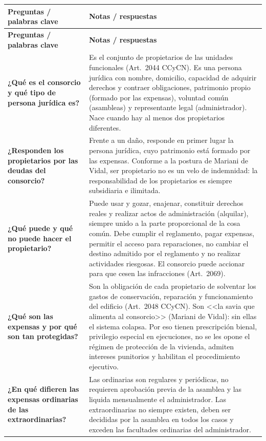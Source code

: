 \documentclass[12pt,oneside]{book}
\newcommand{\cornellheader}{%
    \toprule
    \textbf{Preguntas / palabras clave} &
    \textbf{Notas / respuestas} \\
    \midrule
}
\begin{document}
\begin{longtable}{@{}>{\raggedright\arraybackslash}p{}>{\raggedright\arraybackslash}p{}@{}}
\cornellheader
\endfirsthead
\cornellheader
\endhead

\textbf{¿Qué es el consorcio y qué tipo de persona jurídica es?} &
Es el conjunto de propietarios de las unidades funcionales (Art.~2044 CCyCN). Es una persona jurídica con nombre, domicilio, capacidad de adquirir derechos y contraer obligaciones, patrimonio propio (formado por las expensas), voluntad común (asambleas) y representante legal (administrador). Nace cuando hay al menos dos propietarios diferentes. \\[0.8em]

\textbf{¿Responden los propietarios por las deudas del consorcio?} &
Frente a un daño, responde en primer lugar la persona jurídica, cuyo patrimonio está formado por las expensas. Conforme a la postura de Mariani de Vidal, ser propietario no es un velo de indemnidad: la responsabilidad de los propietarios es siempre subsidiaria e ilimitada. \\[0.8em]

\textbf{¿Qué puede y qué no puede hacer el propietario?} &
Puede usar y gozar, enajenar, constituir derechos reales y realizar actos de administración (alquilar), siempre unido a la parte proporcional de la cosa común. Debe cumplir el reglamento, pagar expensas, permitir el acceso para reparaciones, no cambiar el destino admitido por el reglamento y no realizar actividades riesgosas. El consorcio puede accionar para que cesen las infracciones (Art.~2069). \\[0.8em]

\textbf{¿Qué son las expensas y por qué son tan protegidas?} &
Son la obligación de cada propietario de solventar los gastos de conservación, reparación y funcionamiento del edificio (Art.~2048 CCyCN). Son <<la savia que alimenta al consorcio>> (Mariani de Vidal): sin ellas el sistema colapsa. Por eso tienen prescripción bienal, privilegio especial en ejecuciones, no se les opone el régimen de protección de la vivienda, admiten intereses punitorios y habilitan el procedimiento ejecutivo. \\[0.8em]

\textbf{¿En qué difieren las expensas ordinarias de las extraordinarias?} &
Las ordinarias son regulares y periódicas, no requieren aprobación previa de la asamblea y las liquida mensualmente el administrador. Las extraordinarias no siempre existen, deben ser decididas por la asamblea en todos los casos y exceden las facultades ordinarias del administrador. \\[0.8em]


\end{longtable}
\end{document}
